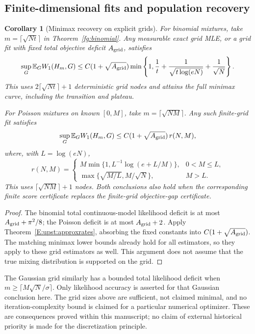 \documentclass[11pt,a4paper]{article}
\newtheorem{corollary}[theorem]{Corollary}
\theoremstyle{definition}
\theoremstyle{remark}
\numberwithin{equation}{section}
\begin{document}
\subsection{Finite-dimensional fits and population recovery}

\begin{corollary}[Minimax recovery on explicit grids]
\label{fg:rates}
For binomial mixtures, take $m=\lceil\sqrt{Nt}\rceil$ in
Theorem~\ref{fg:binomial}. Any measurable exact grid MLE, or a grid
fit with fixed total objective deficit $A_{\rm grid}$, satisfies
\[
 \sup_G\mathbb E_GW_1(H_m,G)
 \le C(1+\sqrt{A_{\rm grid}})
       \min\left\{1,\frac1t+\frac1{\sqrt{t\log(eN)}}
                                      +\frac1{\sqrt N}\right\}.
\]
This uses $2\lceil\sqrt{Nt}\rceil+1$ deterministic grid nodes and
attains the full minimax curve, including the transition and plateau.

For Poisson mixtures on known $[0,M]$, take
$m=\lceil\sqrt{NM}\rceil$. Any such finite-grid fit satisfies
\[
             \sup_G\mathbb E_GW_1(H_m,G)
                  \le C(1+\sqrt{A_{\rm grid}})\,r(N,M),
\]
where, with $L=\log(eN)$,
\[
 r(N,M)=\begin{cases}
 M\min\{1,L^{-1}\log(e+L/M)\},&0<M\le L,\\
 \max\{\sqrt{M/L},M/\sqrt N\},&M>L.
 \end{cases}
\]
This uses $\lceil\sqrt{NM}\rceil+1$ nodes. Both conclusions also
hold when the corresponding finite score certificate replaces the
finite-grid objective-gap certificate.
\end{corollary}

\begin{proof}
The binomial total continuous-model likelihood deficit is at most
$A_{\rm grid}+\pi^2/8$; the Poisson deficit is at most
$A_{\rm grid}+2$. Apply Theorem~\ref{E:upst:approxrates}, absorbing the
fixed constants into $C(1+\sqrt{A_{\rm grid}})$. The matching minimax
lower bounds already hold for all estimators, so they apply to these
grid estimators as well. This argument does not assume that the true
mixing distribution is supported on the grid.
\end{proof}

The Gaussian grid similarly has a bounded total likelihood deficit
when $m\ge\lceil M\sqrt N/\sigma\rceil$. Only likelihood accuracy
is asserted for that Gaussian conclusion here. The grid sizes above
are sufficient, not claimed minimal, and no iteration-complexity bound
is claimed for a particular numerical optimizer. These are consequences
proved within this manuscript; no claim of external historical priority
is made for the discretization principle.
\end{document}
